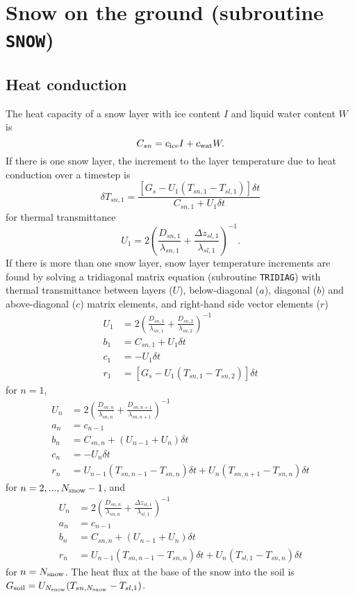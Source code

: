 \documentclass[fleqn]{article}
\begin{document}
\section{Snow on the ground (subroutine {\tt SNOW})}

\subsection{Heat conduction}

The heat capacity of a snow layer with ice content $I$ and liquid water content $W$ is
\begin{equation}
C_{sn} = c_{\rm ice}I + c_{\rm wat}W. 
\end{equation}
If there is one snow layer, the increment to the layer temperature due to heat conduction over a timestep is
\begin{equation}
\delta T_{sn,1} = \frac{[G_s - U_1(T_{sn,1} - T_{sl,1})]\delta t}{C_{sn,1} + U_1\delta t}
\end{equation}
for thermal transmittance
\begin{equation}
U_1 = 2\left(\frac{D_{sn,1}}{\lambda_{sn,1}} + \frac{\Delta z_{sl,1}}{\lambda_{sl,1}}\right)^{-1}.
\end{equation}
If there is more than one snow layer, snow layer temperature increments are found by solving a tridiagonal matrix equation (subroutine {\tt TRIDIAG}) with thermal transmittance between layers ($U$), below-diagonal ($a$), diagonal ($b$) and above-diagonal ($c$) matrix elements, and right-hand side vector elements ($r$)
\begin{align}
U_1 &= 2\left(\frac{D_{sn,1}}{\lambda_{sn,1}} + \frac{D_{sn,2}}{\lambda_{sn,2}}\right)^{-1} \\
b_1 &= C_{sn,1} + U_1 \delta t \\
c_1 &= -U_1\delta t \\
r_1 &=  [G_s - U_1(T_{sn,1} - T_{sn,2})]\delta t
\end{align}
for $n=1$,
\begin{align}
U_n &= 2\left(\frac{D_{sn,n}}{\lambda_{sn,n}} + \frac{D_{sn,n+1}}{\lambda_{sn,n+1}}\right)^{-1} \\
a_n &= c_{n-1} \\
b_n &= C_{sn,n} + (U_{n-1} + U_n)\delta t \\
c_n &= -U_n\delta t \\
r_n &= U_{n-1}(T_{sn,n-1} - T_{sn,n})\delta t + U_n(T_{sn,n+1} - T_{sn,n})\delta t
\end{align}
for $n=2,...,N_{\rm snow}-1$, and
\begin{align}
U_n &= 2\left(\frac{D_{sn,n}}{\lambda_{sn,n}} + \frac{\Delta z_{sl,1}}{\lambda_{sl,1}}\right)^{-1} \\
a_n &= c_{n-1} \\
b_n &= C_{sn,n} + (U_{n-1} + U_n)\delta t \\
r_n &= U_{n-1}(T_{sn,n-1} - T_{sn,n})\delta t + U_n(T_{sl,1} - T_{sn,n})\delta t
\end{align}
for $n=N_{\rm snow}$. The heat flux at the base of the snow into the soil is $G_{\rm soil} = U_{N_{\rm snow}}(T_{sn,N_{\rm snow}} - T_{sl,1})$.
\end{document}
